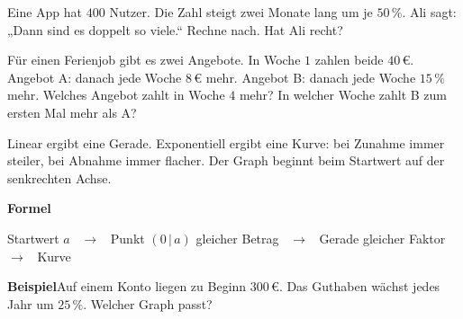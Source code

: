 \documentclass[11pt]{article}
\makeatletter
\newcommand{\aufg}[3]{\par\noindent\makebox[0pt][r]{#3}\begin{minipage}[t]{\linewidth}#1\end{minipage}\par}
\newcommand{\nr}[1]{\makebox[7mm][l]{\textbf{#1}}}
\newlength{\kr}
\newcommand{\karomerk}[2]{\protected@write\@auxout{}{\string\karoseite{#1}{#2}{\thepage}}}
\newcommand{\karoseite}[3]{\expandafter\xdef\csname karo@#1@#2\endcsname{#3}}
\makeatother
\begin{document}
\medskip
\aufg{\nr{3.}Eine App hat $400$ Nutzer. Die Zahl steigt zwei Monate lang um je $50\,\%$. Ali sagt: „Dann sind es doppelt so viele.“ Rechne nach. Hat Ali recht?}{}{}
\medskip
\aufg{\nr{4.}Für einen Ferienjob gibt es zwei Angebote. In Woche $1$ zahlen beide $40\,€$. Angebot A: danach jede Woche $8\,€$ mehr. Angebot B: danach jede Woche $15\,\%$ mehr. Welches Angebot zahlt in Woche $4$ mehr? In welcher Woche zahlt B zum ersten Mal mehr als A?}{}{{\scriptsize\color{mbgrau}Ziel\hspace{2mm}}}
\medskip
\par\vspace{3mm}\setlength{\kr}{\dimexpr\pagegoal-\pagetotal-10mm\relax}%
\ifdim\kr>12mm\karomerk{k}{B}\noindent{\scriptsize\color{mbgrau}Platz zum Rechnen}\par\nointerlineskip\vspace{1mm}\noindent
\begin{tikzpicture}\clip (0,0) rectangle ({\linewidth-0.5mm},\kr);\draw[black!16,line width=0.3pt,step=5mm] (0,0) grid (\linewidth,\kr);\end{tikzpicture}\fi\par
\clearpage\label{s:C}\noindent\colorbox{black!12}{}\hspace{3mm}{\Large\bfseries Den passenden Graphen finden}\par\smallskip
\noindent Linear ergibt eine Gerade. Exponentiell ergibt eine Kurve: bei Zunahme immer steiler, bei Abnahme immer flacher. Der Graph beginnt beim Startwert auf der senkrechten Achse.\par\medskip
\noindent\textbf{Formel}\par\nopagebreak\noindent\hspace*{4mm}\begin{minipage}{\dimexpr\linewidth-4mm\relax}Startwert $a$ \ $\to$ \ Punkt $(0\,|\,a)$ \qquad gleicher Betrag \ $\to$ \ Gerade \qquad gleicher Faktor \ $\to$ \ Kurve\end{minipage}\par\medskip
\noindent\textbf{Beispiel}\quad Auf einem Konto liegen zu Beginn $300\,€$. Das Guthaben wächst jedes Jahr um $25\,\%$. Welcher Graph passt?\par\smallskip
\end{document}
